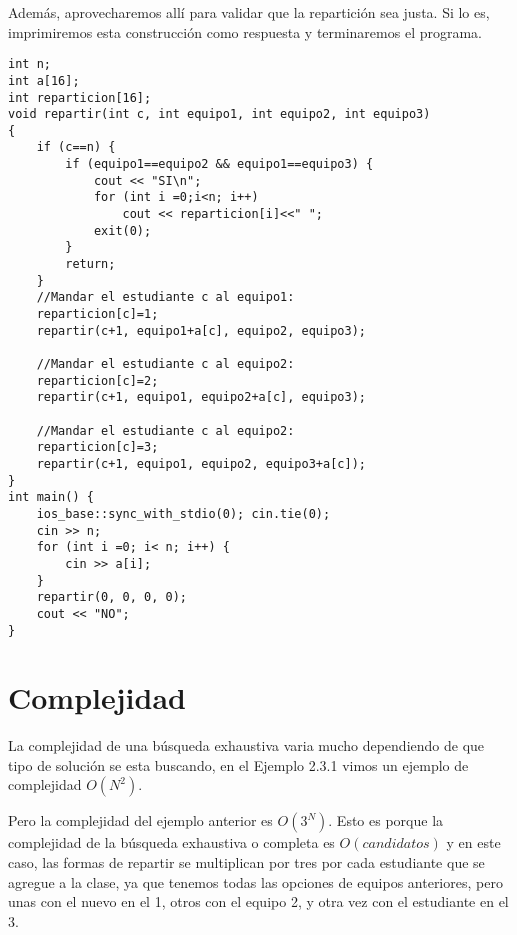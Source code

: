 Además, aprovecharemos allí para validar que la repartición sea justa. Si lo es, imprimiremos esta construcción como respuesta y terminaremos el programa.
\pagebreak
\begin{lstlisting}
int n;
int a[16];
int reparticion[16];
void repartir(int c, int equipo1, int equipo2, int equipo3) 
{
	if (c==n) {
		if (equipo1==equipo2 && equipo1==equipo3) {
			cout << "SI\n";
			for (int i =0;i<n; i++) 
				cout << reparticion[i]<<" ";					
			exit(0);
		}
		return;
	}
	//Mandar el estudiante c al equipo1:
	reparticion[c]=1;
	repartir(c+1, equipo1+a[c], equipo2, equipo3);
	
	//Mandar el estudiante c al equipo2:
	reparticion[c]=2;
	repartir(c+1, equipo1, equipo2+a[c], equipo3);
	
	//Mandar el estudiante c al equipo2:
	reparticion[c]=3;
	repartir(c+1, equipo1, equipo2, equipo3+a[c]);
}
int main() {
	ios_base::sync_with_stdio(0); cin.tie(0);
	cin >> n;
	for (int i =0; i< n; i++) {
		cin >> a[i];
	}
	repartir(0, 0, 0, 0);
	cout << "NO";
}

\end{lstlisting}

\section*{Complejidad}
La complejidad de una búsqueda exhaustiva varia mucho dependiendo de que tipo de solución se esta buscando, en el Ejemplo 2.3.1 vimos un ejemplo de complejidad \(O(N^2)\). 

Pero la complejidad del ejemplo anterior es \(O(3^N)\). Esto es porque la complejidad de la búsqueda exhaustiva o completa es \(O(candidatos)\) y en este caso, las formas de repartir se multiplican por tres por cada estudiante que se agregue a la clase, ya que tenemos todas las opciones de equipos anteriores, pero unas con el nuevo en el 1, otros con el equipo 2, y otra vez con el estudiante en el 3.

